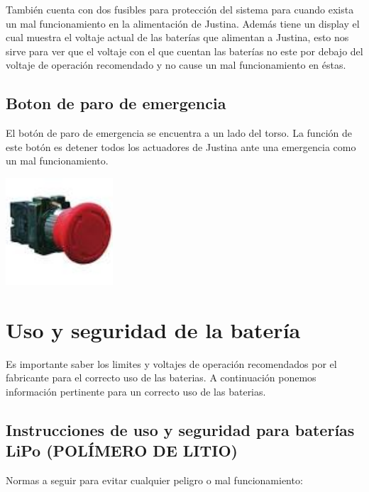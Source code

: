 \documentclass[user_manual.tex]{subfiles}
\begin{document}
También cuenta con dos fusibles para protección del sistema para cuando exista un mal funcionamiento en la alimentación de 
Justina. Además tiene un display el cual muestra el voltaje actual de las baterías que alimentan a Justina, esto nos sirve
para ver que el voltaje con el que cuentan las baterías no este por debajo del voltaje de operación recomendado y no cause
un mal funcionamiento en éstas.

\subsection{Boton de paro de emergencia}
El botón de paro de emergencia se encuentra a un lado del torso. La función de este botón es 
detener todos los actuadores de Justina ante una emergencia como un mal funcionamiento.
\begin{center}
\includegraphics[width=0.3\textwidth]{Figures/Hardware/Partes/RBES.jpg}
\label{fig:Hardware:Partes:Paro:Boton}
\end{center}

\section{Uso y seguridad de la batería}

Es importante saber los limites y voltajes de operación recomendados por el fabricante para el correcto uso de las baterias. 
A continuación ponemos información pertinente para un correcto uso de las baterias.
\subsection{Instrucciones de uso y seguridad para baterías LiPo (POLÍMERO DE LITIO)}
Normas a seguir para evitar cualquier peligro o mal funcionamiento:
\end{document}
